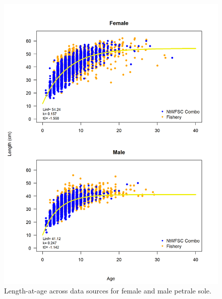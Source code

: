 \documentclass[12pt,]{article}
\begin{document}
\FloatBarrier

\begin{figure}
\centering
\includegraphics{Figures/LengthAgeAll.png}
\caption{Length-at-age across data sources for female and male petrale
sole. \label{fig:length_age}}
\end{figure}

\FloatBarrier
\end{document}
